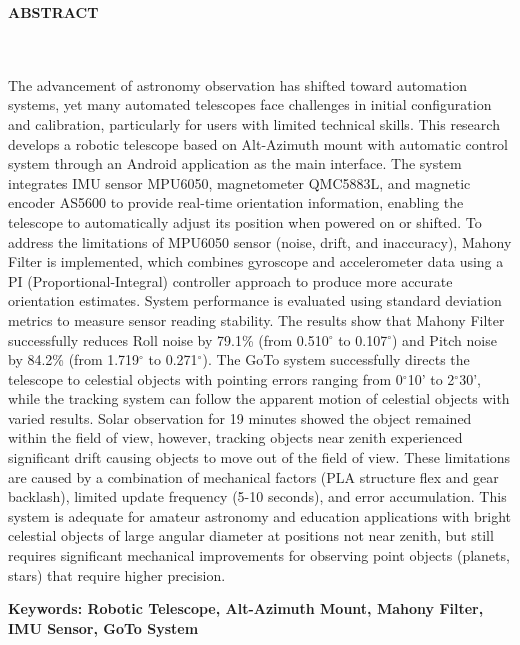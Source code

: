 \clearpage
{}%
\thispagestyle{fancy}

\begin{center}
	\large \bfseries \MakeUppercase{Abstract}\\
	\normalsize \normalfont {\thetitleEN}\\
	\normalsize \normalfont {\theauthor}\\
	\bigskip
	
	\normalsize \normalfont \justifying \singlespacing
	The advancement of astronomy observation has shifted toward automation systems, yet many automated telescopes face challenges in initial configuration and calibration, particularly for users with limited technical skills. This research develops a robotic telescope based on Alt-Azimuth mount with automatic control system through an Android application as the main interface. The system integrates IMU sensor MPU6050, magnetometer QMC5883L, and magnetic encoder AS5600 to provide real-time orientation information, enabling the telescope to automatically adjust its position when powered on or shifted. To address the limitations of MPU6050 sensor (noise, drift, and inaccuracy), Mahony Filter is implemented, which combines gyroscope and accelerometer data using a PI (Proportional-Integral) controller approach to produce more accurate orientation estimates. System performance is evaluated using standard deviation metrics to measure sensor reading stability. The results show that Mahony Filter successfully reduces Roll noise by 79.1\% (from 0.510$^{\circ}$ to 0.107$^{\circ}$) and Pitch noise by 84.2\% (from 1.719$^{\circ}$ to 0.271$^{\circ}$). The GoTo system successfully directs the telescope to celestial objects with pointing errors ranging from 0$^{\circ}$10' to 2$^{\circ}$30', while the tracking system can follow the apparent motion of celestial objects with varied results. Solar observation for 19 minutes showed the object remained within the field of view, however, tracking objects near zenith experienced significant drift causing objects to move out of the field of view. These limitations are caused by a combination of mechanical factors (PLA structure flex and gear backlash), limited update frequency (5-10 seconds), and error accumulation. This system is adequate for amateur astronomy and education applications with bright celestial objects of large angular diameter at positions not near zenith, but still requires significant mechanical improvements for observing point objects (planets, stars) that require higher precision.\par
    
    \vspace{20pt}
	\raggedright\textbf{Keywords: Robotic Telescope, Alt-Azimuth Mount, Mahony Filter, IMU Sensor, GoTo System}
	
	\vfill
	
\end{center}
\clearpage